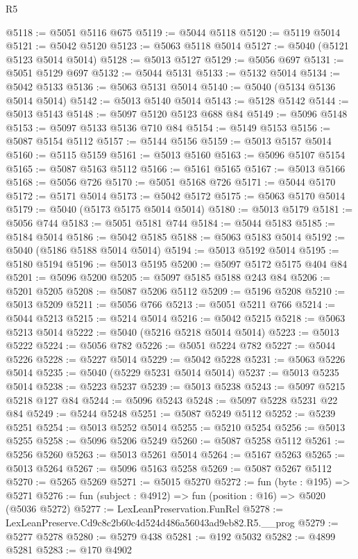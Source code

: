 \begin{lexlean}{R5}
\begin{coremodule}
@5118 := @5051 @5116 @675
@5119 := @5044 @5118
@5120 := @5119 @5014
@5121 := @5042 @5120
@5123 := @5063 @5118 @5014
@5127 := @5040 (@5121 @5123 @5014 @5014)
@5128 := @5013 @5127
@5129 := @5056 @697
@5131 := @5051 @5129 @697
@5132 := @5044 @5131
@5133 := @5132 @5014
@5134 := @5042 @5133
@5136 := @5063 @5131 @5014
@5140 := @5040 (@5134 @5136 @5014 @5014)
@5142 := @5013 @5140 @5014
@5143 := @5128 @5142
@5144 := @5013 @5143
@5148 := @5097 @5120 @5123 @688 @84
@5149 := @5096 @5148
@5153 := @5097 @5133 @5136 @710 @84
@5154 := @5149 @5153
@5156 := @5087 @5154 @5112
@5157 := @5144 @5156
@5159 := @5013 @5157 @5014
@5160 := @5115 @5159
@5161 := @5013 @5160
@5163 := @5096 @5107 @5154
@5165 := @5087 @5163 @5112
@5166 := @5161 @5165
@5167 := @5013 @5166
@5168 := @5056 @726
@5170 := @5051 @5168 @726
@5171 := @5044 @5170
@5172 := @5171 @5014
@5173 := @5042 @5172
@5175 := @5063 @5170 @5014
@5179 := @5040 (@5173 @5175 @5014 @5014)
@5180 := @5013 @5179
@5181 := @5056 @744
@5183 := @5051 @5181 @744
@5184 := @5044 @5183
@5185 := @5184 @5014
@5186 := @5042 @5185
@5188 := @5063 @5183 @5014
@5192 := @5040 (@5186 @5188 @5014 @5014)
@5194 := @5013 @5192 @5014
@5195 := @5180 @5194
@5196 := @5013 @5195
@5200 := @5097 @5172 @5175 @404 @84
@5201 := @5096 @5200
@5205 := @5097 @5185 @5188 @243 @84
@5206 := @5201 @5205
@5208 := @5087 @5206 @5112
@5209 := @5196 @5208
@5210 := @5013 @5209
@5211 := @5056 @766
@5213 := @5051 @5211 @766
@5214 := @5044 @5213
@5215 := @5214 @5014
@5216 := @5042 @5215
@5218 := @5063 @5213 @5014
@5222 := @5040 (@5216 @5218 @5014 @5014)
@5223 := @5013 @5222
@5224 := @5056 @782
@5226 := @5051 @5224 @782
@5227 := @5044 @5226
@5228 := @5227 @5014
@5229 := @5042 @5228
@5231 := @5063 @5226 @5014
@5235 := @5040 (@5229 @5231 @5014 @5014)
@5237 := @5013 @5235 @5014
@5238 := @5223 @5237
@5239 := @5013 @5238
@5243 := @5097 @5215 @5218 @127 @84
@5244 := @5096 @5243
@5248 := @5097 @5228 @5231 @22 @84
@5249 := @5244 @5248
@5251 := @5087 @5249 @5112
@5252 := @5239 @5251
@5254 := @5013 @5252 @5014
@5255 := @5210 @5254
@5256 := @5013 @5255
@5258 := @5096 @5206 @5249
@5260 := @5087 @5258 @5112
@5261 := @5256 @5260
@5263 := @5013 @5261 @5014
@5264 := @5167 @5263
@5265 := @5013 @5264
@5267 := @5096 @5163 @5258
@5269 := @5087 @5267 @5112
@5270 := @5265 @5269
@5271 := @5015 @5270
@5272 := fun (byte : @195) => @5271
@5276 := fun (subject : @4912) => fun (position : @16) => @5020 (@5036 @5272)
@5277 := LexLeanPreservation.FunRel
@5278 := LexLeanPreserve.Cd9c8c2b60c4d524d486a56043ad9eb82.R5.__prog
@5279 := @5277 @5278
@5280 := @5279 @438
@5281 := @192 @5032
@5282 := @4899 @5281
@5283 := @170 @4902

\end{coremodule}
\end{lexlean}
